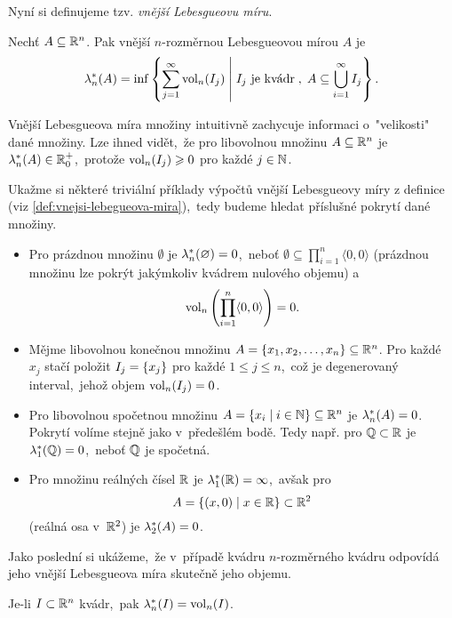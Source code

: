 Nyní si definujeme tzv. \emph{vnější Lebesgueovu míru}.
\begin{definition}\label{def:vnejsi-lebegueova-mira}
    Nechť $A\subseteq\mathbb{R}^n$. Pak vnější $n$-rozměr\-nou Lebesgueovou mírou $A$ je
    \[\lambda_n^*(A)=\inf\left\{\sum_{j=1}^{\infty}\operatorname{vol}_n(I_j)\;\middle|\;\text{$I_j$ je kvádr}\;,\;A\subseteq\bigcup_{i=1}^\infty I_j\right\}.\]
\end{definition}
Vnější Lebesgueova míra množiny intuitivně zachycuje informaci o~"velikosti" dané množiny.  Lze ihned vidět,~že pro libovolnou množinu $A\subseteq\mathbb{R}^n$ je $\lambda_n^*(A)\in\mathbb{R}_0^+$,~protože $\operatorname{vol}_n(I_j)\geqslant0$ pro každé $j\in\mathbb{N}$.
\begin{example}\label{ex:lebegueova-mira-trivialni-priklady}
    Ukažme si některé triviální příklady výpočtů vnější Lebesgueovy míry z definice (viz \ref{def:vnejsi-lebegueova-mira}),~tedy budeme hledat příslušné pokrytí dané množiny.
    \begin{itemize}
        \item Pro prázdnou množinu $\emptyset$ je $\lambda_n^*(\varnothing)=0$,~neboť $\emptyset\subseteq\prod_{i=1}^{n}\langle0,0\rangle$ (prázdnou množinu lze pokrýt jakýmkoliv kvádrem nulového objemu) a
        \[\operatorname{vol}_n\left(\prod_{i=1}^{n}\langle0,0\rangle\right)=0.\]
        \item Mějme libovolnou konečnou množinu $A=\left\{x_1,x_2,\dots,x_n\right\}\subseteq\mathbb{R}^n$. Pro každé $x_j$ stačí položit $I_j=\left\{x_j\right\}$ pro každé $1\leqslant j\leqslant n$,~což je degenerovaný interval,~jehož objem $\operatorname{vol}_n(I_j)=0$.
        \item Pro libovolnou spočetnou množinu $A=\left\{x_i\mid i\in\mathbb{N}\right\}\subseteq\mathbb{R}^n$ je $\lambda_n^*(A)=0$. Pokrytí volíme stejně jako v~předešlém bodě. Tedy např. pro $\mathbb{Q}\subset\mathbb{R}$ je $\lambda_1^*(\mathbb{Q})=0$,~neboť $\mathbb{Q}$ je spočetná.
        \item Pro množinu reálných čísel $\mathbb{R}$ je $\lambda_1^*(\mathbb{R})=\infty$,~avšak pro 
        \[A=\left\{(x,0)\mid x\in\mathbb{R}\right\}\subset\mathbb{R}^2\]
        (reálná osa v~$\mathbb{R}^2$) je $\lambda_2^*(A)=0$.
    \end{itemize}
\end{example}
Jako poslední si ukážeme,~že v~případě kvádru $n$-rozměrného kvádru odpovídá jeho vnější Lebesgueova míra skutečně jeho objemu.
\begin{proposition}\label{prop:lebegueova-mira-objem-kvadru}
    Je-li $I\subset\mathbb{R}^n$ kvádr,~pak $\lambda_n^*(I)=\operatorname{vol}_n(I)$.
\end{proposition}
